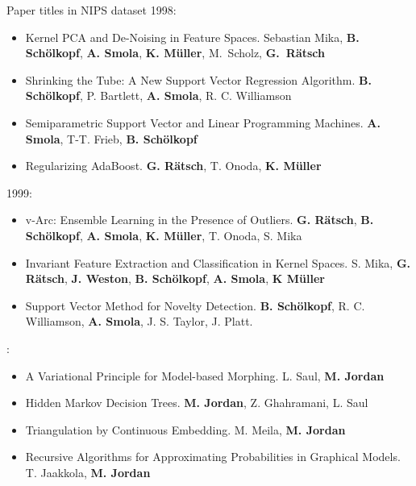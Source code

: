 \documentclass[10pt, mathserif]{beamer} %
\theoremstyle{definition}
\theoremstyle{plain}
\begin{document}
\begin{frame}[label=NIPS]{Paper titles in NIPS dataset}
\tiny
1998:

\begin{itemize}
\item {\color{red} Kernel} PCA and De-Noising in Feature Spaces. Sebastian Mika, {\bf B. Sch\"{o}lkopf}, {\bf A. Smola}, {\bf K. M\"{u}ller}, M.\ Scholz, {\bf G.\ R\"{a}tsch}
\item  Shrinking the Tube: A New {\color{red} Support Vector Regression Algorithm}. {\bf B. Sch\"{o}lkopf}, P. Bartlett, {\bf A. Smola}, R. C. Williamson
\item Semiparametric {\color{red} Support Vector} and Linear Programming Machines. {\bf A. Smola}, T-T. Frieb, {\bf B. Sch\"{o}lkopf}
\item Regularizing AdaBoost. {\bf G. R\"{a}tsch}, T. Onoda, {\bf K. M\"{u}ller}
\end{itemize}

\bigskip

1999:
\begin{itemize}
\item v-Arc: Ensemble Learning in the Presence of Outliers. {\bf G. R\"{a}tsch}, {\bf B. Sch\"{o}lkopf}, {\bf A. Smola}, {\bf K. M\"{u}ller}, T. Onoda, S. Mika
\item Invariant Feature Extraction and Classification in Kernel Spaces. S. Mika, {\bf G. R\"{a}tsch}, {\bf J. Weston}, {\bf B. Sch\"{o}lkopf}, {\bf A. Smola}, {\bf K M\"{u}ller}
\item {\color{red} Support Vector Method} for Novelty Detection. {\bf B. Sch\"{o}lkopf}, R. C. Williamson, {\bf A. Smola}, J. S. Taylor, J. Platt.
\end{itemize}

:
\begin{itemize}
\item A Variational Principle for {\color{blue}Model}-based Morphing. L. Saul, {\bf M. Jordan}
\item Hidden Markov Decision Trees. {\bf M. Jordan}, Z. Ghahramani, L. Saul
\item Triangulation by Continuous Embedding. M. Meila, {\bf M. Jordan}
\item Recursive Algorithms for Approximating Probabilities in Graphical {\color{blue}Models}. T. Jaakkola, {\bf M. Jordan}
\end{itemize}


{\hfill \hyperlink{result}{}}
\end{frame}
\end{document}
